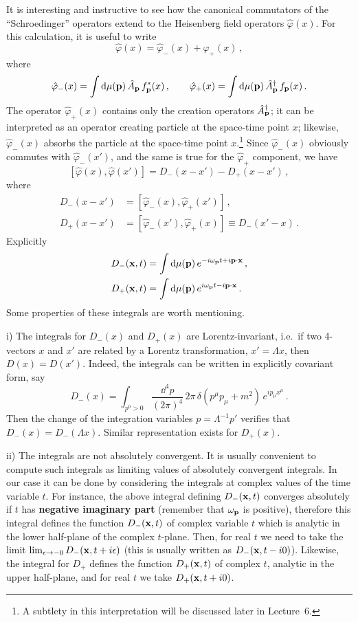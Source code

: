 It is interesting and instructive to see how the canonical commutators of the
``Schroedinger'' operators extend to the Heisenberg field operators
$\hat\varphi(x)$. For this calculation, it is useful to write
\[
\hat\varphi(x)=\hat\varphi_-(x)+\hat\varphi_+(x)\,,
\]
where
\[
\hat\varphi_-(x)=\int \mathop{}\!\mathrm{d}\mu(\mathbf{p})\,\hat A_{\mathbf{p}}\,f^*_{\mathbf{p}}(x)\,,\qquad
\hat\varphi_+(x)=\int \mathop{}\!\mathrm{d}\mu(\mathbf{p})\,\hat A^\dagger_{\mathbf{p}}\,f_{\mathbf{p}}(x)\,.
\]
The operator $\hat\varphi_+(x)$ contains only the creation operators
$\hat A^\dagger_{\mathbf{p}}$; it can be interpreted as an operator creating particle
at the space-time point $x$; likewise, $\hat\varphi_-(x)$ absorbs the particle
at the space-time point $x$.\footnote{A subtlety in this interpretation will
be discussed later in Lecture~6.} Since $\hat\varphi_-(x)$ obviously commutes
with $\hat\varphi_-(x')$, and the same is true for the $\hat\varphi_+$
component, we have
\[
[\hat\varphi(x),\hat\varphi(x')]=D_-(x-x')-D_+(x-x')\,,
\]
where
\begin{align*}
D_-(x-x')&=[\hat\varphi_-(x),\hat\varphi_+(x')]\,,\\
D_+(x-x')&=[\hat\varphi_-(x'),\hat\varphi_+(x)]\equiv D_-(x'-x)\,.
\end{align*}
Explicitly
\begin{align*}
D_-(\mathbf{x},t)&=\int \mathop{}\!\mathrm{d}\mu(\mathbf{p})\,e^{-i\omega_{\mathbf{p}} t+i\mathbf{p}\cdot\mathbf{x}}\,,\\
D_+(\mathbf{x},t)&=\int \mathop{}\!\mathrm{d}\mu(\mathbf{p})\,e^{i\omega_{\mathbf{p}} t-i\mathbf{p}\cdot\mathbf{x}}\,.
\end{align*}
Some properties of these integrals are worth mentioning.

i) The integrals for $D_-(x)$ and $D_+(x)$ are Lorentz-invariant, i.e.\ if two
4-vectors $x$ and $x'$ are related by a Lorentz transformation, $x'=\Lambda x$,
then $D(x)=D(x')$. Indeed, the integrals can be written in explicitly
covariant form, say
\[
D_-(x)=\int_{p^0>0}\frac{\dd^4p}{(2\pi)^4}\,2\pi\,\delta(p^\mu p_\mu+m^2)\,e^{ip_\mu x^\mu}\,.
\]
Then the change of the integration variables $p=\Lambda^{-1}p'$ verifies that
$D_-(x)=D_-(\Lambda x)$. Similar representation exists for $D_+(x)$.

ii) The integrals are not absolutely convergent. It is usually convenient to
compute such integrals as limiting values of absolutely convergent integrals.
In our case it can be done by considering the integrals at complex values of
the time variable $t$. For instance, the above integral defining
$D_-(\mathbf{x},t)$ converges absolutely if $t$ has \textbf{negative imaginary part}
(remember that $\omega_{\mathbf{p}}$ is positive), therefore this integral defines the
function $D_-(\mathbf{x},t)$ of complex variable $t$ which is analytic in the lower
half-plane of the complex $t$-plane. Then, for real $t$ we need to take the
limit $\lim_{\epsilon\to-0}D_-(\mathbf{x},t+i\epsilon)$ (this is usually written as
$D_-(\mathbf{x},t-i0)$). Likewise, the integral for $D_+$ defines the function
$D_+(\mathbf{x},t)$ of complex $t$, analytic in the upper half-plane, and for real
$t$ we take $D_+(\mathbf{x},t+i0)$.

